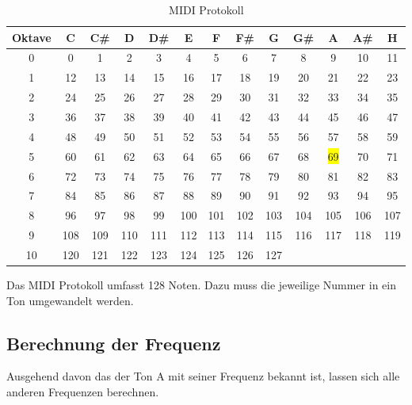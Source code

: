 \documentclass[12pt,a4paper]{report}
\begin{document}
\begin{table}[htbp]
  \centering
  \caption{MIDI Protokoll}
    \begin{tabular}{|c|cccccccccccc|}

    \hline
    Oktave& C     & C\#   & D     & D\#   & E     & F     & F\#   & G     & G\#   & A     & A\#   & H \\
    \hline

    0     & 0     & 1     & 2     & 3     & 4     & 5     & 6     & 7     & 8     & 9     & 10    & 11 \\
    1     & 12    & 13    & 14    & 15    & 16    & 17    & 18    & 19    & 20    & 21    & 22    & 23 \\
    2     & 24    & 25    & 26    & 27    & 28    & 29    & 30    & 31    & 32    & 33    & 34    & 35 \\
    3     & 36    & 37    & 38    & 39    & 40    & 41    & 42    & 43    & 44    & 45    & 46    & 47 \\
    4     & 48    & 49    & 50    & 51    & 52    & 53    & 54    & 55    & 56    & 57    & 58    & 59 \\
    5     & 60    & 61    & 62    & 63    & 64    & 65    & 66    & 67    & 68 &\colorbox{yellow}{69}& 70    & 71 \\
    6     & 72    & 73    & 74    & 75    & 76    & 77    & 78    & 79    & 80    & 81    & 82    & 83 \\
    7     & 84    & 85    & 86    & 87    & 88    & 89    & 90    & 91    & 92    & 93    & 94    & 95 \\
    8     & 96    & 97    & 98    & 99    & 100   & 101   & 102   & 103   & 104   & 105   & 106   & 107 \\
    9     & 108   & 109   & 110   & 111   & 112   & 113   & 114   & 115   & 116   & 117   & 118   & 119 \\
    10    & 120   & 121   & 122   & 123   & 124   & 125   & 126   & 127   &       &       &       &  \\
    \hline
    \end{tabular}%
  \label{tab:addlabel}%
\end{table}%
Das MIDI Protokoll umfasst 128 Noten. Dazu muss die jeweilige Nummer in ein Ton
umgewandelt werden.

\subsection{Berechnung der Frequenz}

Ausgehend davon das der Ton A mit seiner Frequenz bekannt ist, lassen
sich alle anderen Frequenzen berechnen.
\end{document}
